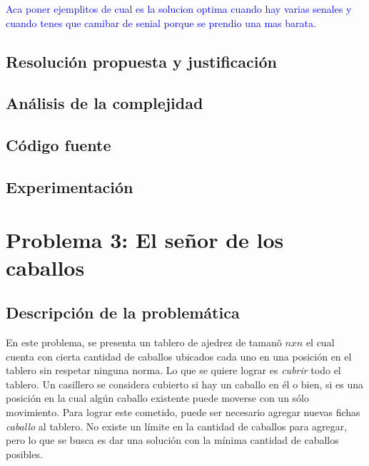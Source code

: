 \documentclass[a4paper]{article}
\begin{document}
\textcolor{blue}{Aca poner ejemplitos de cual es la solucion optima cuando hay varias senales y cuando tenes que camibar de senial porque se prendio una mas barata.}

\subsection{Resoluci\'on propuesta y justificaci\'on}




\subsection{An\'alisis de la complejidad}
\subsection{C\'odigo fuente}
\subsection{Experimentaci\'on}



\newpage

\section{Problema 3: El se\~nor de los caballos}
\subsection{Descripci\'on de la problem\'atica}

En este problema, se presenta un tablero de ajedrez de taman\~o $nxn$ el cual cuenta con cierta cantidad de caballos ubicados cada uno en una posici\'on en el tablero sin respetar ninguna norma. Lo que se quiere lograr es \emph{cubrir} todo el tablero. Un casillero se considera cubierto si hay un caballo en \'el o bien, si es una posici\'on en la cual alg\'un caballo existente puede moverse con un s\'olo movimiento. Para lograr este cometido, puede ser necesario agregar nuevas fichas \emph{caballo} al tablero. No existe un l\'imite en la cantidad de caballos para agregar, pero lo que se busca es dar una soluci\'on con la m\'inima cantidad de caballos posibles.\\
\end{document}
